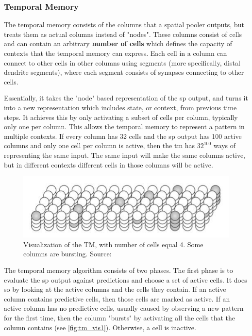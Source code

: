 \subsubsection{Temporal Memory}
\label{sec:temporal_memory}
The temporal memory consists of the columns that a spatial pooler outputs, but treats them as actual columns instead of "nodes". These columns consist of cells and can contain an arbitrary \textbf{number of cells} which defines the capacity of contexts that the temporal memory can express. Each cell in a column can connect to other cells in other columns using segments (more specifically, distal dendrite segments), where each segment consists of synapses connecting to other cells.
\par
Essentially, it takes the "node" based representation of the \gls*{sp} output, and turns it into a new representation which includes state, or context, from previous time steps. It achieves this by only activating a subset of cells per column, typically only one per column. This allows the temporal memory to represent a pattern in multiple contexts. If every column has 32 cells and the \gls*{sp} output has 100 active columns and only one cell per column is active, then the \gls*{tm} has $32^{100}$ ways of representing the same input. The same input will make the same columns active, but in different contexts different cells in those columns will be active.
\begin{figure}[H]
    \centering
    \includegraphics[width=\linewidth]{resources/related_works/tm_vis_alt2}
    \caption{Visualization of the TM, with number of cells equal 4. Some columns are bursting. Source: \cite{BAMI}}
\end{figure}
\par
The temporal memory algorithm consists of two phases. The first phase is to evaluate the \gls*{sp} output against predictions and choose a set of active cells. It does so by looking at the active columns and the cells they contain. If an active column contains predictive cells, then those cells are marked as active. If an active column has no predictive cells, usually caused by observing a new pattern for the first time, then the column "bursts" by activating all the cells that the column contains (see \autoref{fig:tm_vis1}). Otherwise, a cell is inactive.
